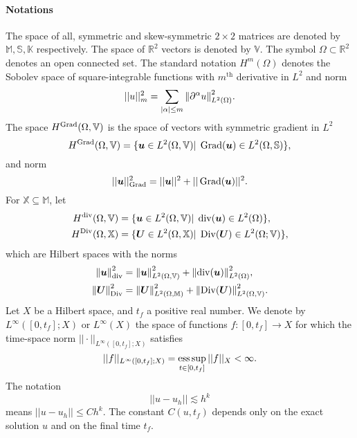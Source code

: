 \paragraph{Notations}
The space of all, symmetric and skew-symmetric $2\times 2$ matrices are denoted by $\mathbb{M}, \mathbb{S}, \mathbb{K}$ respectively. The space of $\mathbb{R}^2$ vectors is denoted by $\mathbb{V}$. The symbol $\Omega \subset \mathbb{R}^2$ denotes an open connected set. The standard notation $H^m(\Omega)$ denotes the Sobolev space of square-integrable functions with  $m^\text{th}$ derivative in $L^2$ and norm 
\begin{equation*}
||u||_m^2 = {\sum_{|\alpha|\le m} \left\|\partial^\alpha u\right\|_{L^2(\Omega)}^2}.
\end{equation*}
The space $H^{\operatorname*{Grad}}(\Omega, \mathbb{V})$ is the space of vectors with symmetric gradient in $L^2$
\begin{equation*}
H^{\operatorname*{Grad}}(\Omega, \mathbb{V}) = \{\bm{u} \in L^2(\Omega, \mathbb{V}) \vert \; \operatorname*{Grad}(\bm{u}) \in L^2(\Omega, \mathbb{S}) \},
\end{equation*}
and norm 
\begin{equation*}
||\bm{u}||_{\operatorname*{Grad}}^2 = {||\bm{u}||^2 + ||\operatorname*{Grad}(\bm{u})||^2}.
\end{equation*}
For $\mathbb{X} \subseteq \mathbb{M}$, let
\begin{equation*}
\begin{aligned}
H^{\operatorname{div}}(\Omega, \mathbb{V}) &= \{\bm{u} \in L^2(\Omega, \mathbb{V}) \vert \; \operatorname{div}(\bm{u}) \in L^2(\Omega) \}, \\
H^{\operatorname*{Div}}(\Omega, \mathbb{X}) &= \{\bm{U} \in L^2(\Omega, \mathbb{X}) \vert \; \operatorname*{Div}(\bm{U}) \in L^2(\Omega; \mathbb{V}) \},
\end{aligned}
\end{equation*}
which are Hilbert spaces with the norms 
\begin{align*}
\left\|\bm{u}\right\|_{\operatorname{div}}^2 &= {\left\|\bm{u}\right\|_{L^2(\Omega, \mathbb{V})}^2 + \left\|\operatorname{div}(\bm{u})\right\|_{L^2(\Omega)}^2}, \\
\left\|\bm{U}\right\|_{\operatorname*{Div}}^2 &= {\left\|\bm{U}\right\|_{L^2(\Omega, \mathbb{M})}^2 + \left\|\operatorname*{Div}(\bm{U})\right\|_{L^2(\Omega, \mathbb{V})}^2}.
\end{align*}
Let ${X}$ be a Hilbert space, and $t_f$ a positive real number. We denote by $L^\infty([0, t_f]; {X})$ or $L^\infty({X})$ the space of functions $f: [0, t_f] \rightarrow X$ for which the time-space norm $||\cdot||_{L^\infty([0, t_f]; {X})}$ satisfies
\[
||f||_{L^\infty([0, t_f]; {X})} = \operatorname*{ess\,sup}_{t \in [0,t_f]} ||f||_{{X}} < \infty.
\]
The notation
$$||u - u_h || \lesssim  h^k$$
means $||u - u_h|| \le C h^k$. The constant $C(u, t_f)$ depends only on the exact solution $u$ and on the final time $t_f$.

